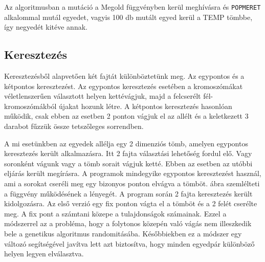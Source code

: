 \documentclass[12pt,a4paper,oneside]{report}
\begin{document}
	Az algoritmusban a mutáció a Megold függvényben kerül meghívásra és \texttt{POPMERET} alkalommal mutál egyedet, vagyis 100 db mutált egyed kerül a TEMP tömbbe, így negyedét kitéve annak.


            
        \subsection{Keresztezés} %
            
            Keresztezésből alapvetően két fajtát különböztetünk meg.
            Az egypontos és a kétpontos keresztezést.
            Az egypontos keresztezés esetében a kromoszómákat véletlenszerűen választott helyen kettévágjuk, majd a felcserélt fél-kromoszómákból újakat hozunk létre.
            A kétpontos keresztezés hasonlóan működik, csak ebben az esetben 2 ponton vágjuk el az allélt és a keletkezett 3 darabot fűzzük össze tetszőleges sorrendben.
                        
            A mi esetünkben az egyedek allélja egy 2 dimenziós tömb, amelyen egypontos keresztezés került alkalmazásra.
            Itt 2 fajta választási lehetőség fordul elő. Vagy soronként vágunk vagy a tömb sorait vágjuk ketté.
            Ebben az esetben az utóbbi eljárás került megírásra.
            A programok mindegyike egypontos keresztezést használ, ami a sorokat cseréli meg egy bizonyos ponton elvágva a tömböt.
             ábra szemlélteti a függvény működésének a lényegét.
            A program során 2 fajta keresztezés került kidolgozásra.
            Az első verzió egy fix ponton vágta el a tömböt és a 2 felét cserélte meg.
            A fix pont a számtani közepe a tulajdonságok számainak. Ezzel a módszerrel az a probléma, hogy a folytonos közepén való vágás nem illeszkedik bele a genetikus algoritmus randomitásába. Későbbiekben ez a módszer egy változó segítségével javítva lett azt biztosítva, hogy minden egyedpár különböző helyen legyen elválasztva.
            
                     
\end{document}
